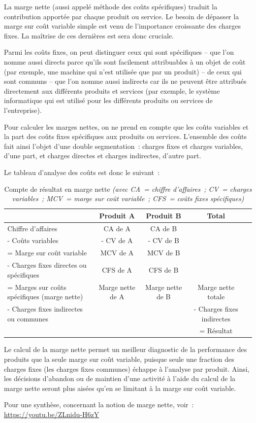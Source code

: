 \documentclass[oneside]{kaobook}
\begin{document}
La marge nette (aussi appelé méthode des coûts spécifiques) traduit la contribution apportée par chaque produit ou service. Le besoin de dépasser la marge sur coût variable simple est venu de l'importance croissante des charges fixes. La maîtrise de ces dernières est sera donc cruciale.

Parmi les coûts fixes, on peut distinguer ceux qui sont spécifiques – que l'on nomme aussi directs parce qu'ils sont facilement attribuables à un objet de coût (par exemple, une machine qui n'est utilisée que par un produit) – de ceux qui sont communs – que l'on nomme aussi indirects car ils ne peuvent être attribués directement aux différents produits et services (par exemple, le système informatique qui est utilisé pour les différents produits ou services de l'entreprise).

Pour calculer les marges nettes, on ne prend en compte que les coûts variables et la part des coûts fixes spécifiques aux produits ou services. L'ensemble des coûts fait ainsi l'objet d'une double segmentation : charges fixes et charges variables, d'une part, et charges directes et charges indirectes, d'autre part.

Le tableau d'analyse des coûts est donc le suivant :

\begin{table}[htbp]
\caption{Compte de résultat en marge nette \emph{(avec CA = chiffre d'affaires ; CV = charges variables ; MCV = marge sur coût variable ; CFS = coûts fixes spécifiques)}}
\centering
\sidenotesize
\begin{tabular}{p{3cm} c c cp{2cm}}
 & Produit A & Produit B & Total\\
\hline
Chiffre d'affaires & CA de A & CA de B & \\
- Coûts variables & - CV de A & - CV de B & \\
= Marge sur coût variable & MCV de A & MCV de B & \\
- Charges fixes directes ou spécifiques & CFS de A & CFS de B & \\
= Marges sur coûts spécifiques (marge nette) & Marge nette de A & Marge nette de B & Marge nette totale\\
- Charges fixes indirectes ou communes &  &  & - Charges fixes indirectes\\
 &  &  & = Résultat\\
\end{tabular}
\end{table}

\begin{kaobox}
Le calcul de la marge nette permet un meilleur diagnostic de la performance des produits que la seule marge sur coût variable, puisque seule une fraction des charges fixes (les charges fixes communes) échappe à l'analyse par produit. Ainsi, les décisions d'abandon ou de maintien d'une activité à l'aide du calcul de la marge nette seront plus aisées qu'en se limitant à la marge sur coût variable.

Pour une synthèse, concernant la notion de marge nette, voir : \url{https://youtu.be/ZLnidu-H6zY}
\end{kaobox}
\end{document}
